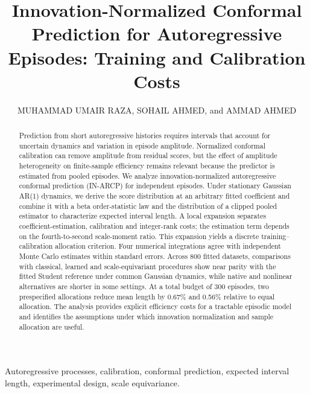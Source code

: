 \documentclass[nolineno]{ieeeaccess}
\begin{document}
\history{}
\doi{}
\title{Innovation-Normalized Conformal Prediction for Autoregressive Episodes: Training and Calibration Costs}
\author{\uppercase{Muhammad Umair Raza},
\uppercase{Sohail Ahmed}, and
\uppercase{Ammad Ahmed}}
\address[1]{Department of Avionics Engineering, College of Aeronautical Engineering, National University of Sciences and Technology, Risalpur, Pakistan}
\address[2]{MathWorks, United States}
\address[3]{NDMA, Pakistan}
\begin{abstract}
Prediction from short autoregressive histories requires intervals that account for uncertain dynamics and variation in episode amplitude. Normalized conformal calibration can remove amplitude from residual scores, but the effect of amplitude heterogeneity on finite-sample efficiency remains relevant because the predictor is estimated from pooled episodes. We analyze innovation-normalized autoregressive conformal prediction (IN-ARCP) for independent episodes. Under stationary Gaussian AR(1) dynamics, we derive the score distribution at an arbitrary fitted coefficient and combine it with a beta order-statistic law and the distribution of a clipped pooled estimator to characterize expected interval length. A local expansion separates coefficient-estimation, calibration and integer-rank costs; the estimation term depends on the fourth-to-second scale-moment ratio. This expansion yields a discrete training--calibration allocation criterion. Four numerical integrations agree with independent Monte Carlo estimates within \MaxIntegralZ{} standard errors. Across 800 fitted datasets, comparisons with classical, learned and scale-equivariant procedures show near parity with the fitted Student reference under common Gaussian dynamics, while native and nonlinear alternatives are shorter in some settings. At a total budget of 300 episodes, two prespecified allocations reduce mean length by 0.67\% and 0.56\% relative to equal allocation. The analysis provides explicit efficiency costs for a tractable episodic model and identifies the assumptions under which innovation normalization and sample allocation are useful.
\end{abstract}
\begin{keywords}
Autoregressive processes, calibration, conformal prediction, expected interval length, experimental design, scale equivariance.
\end{keywords}
\maketitle
\end{document}
